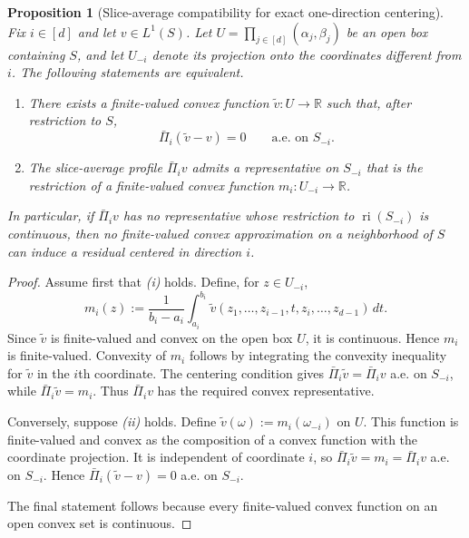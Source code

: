 \documentclass[11pt,letterpaper]{article}
\newtheorem{proposition}[theorem]{Proposition}
\theoremstyle{definition}
\theoremstyle{remark}
\begin{document}
\begin{proposition}[Slice-average compatibility for exact one-direction centering]
\label{prop:one_direction_centered_realizability}
Fix $i\in[d]$ and let $v\in L^1(S)$. Let
$U=\prod_{j\in[d]}(\alpha_j,\beta_j)$ be an open box containing $S$, and let
$U_{-i}$ denote its projection onto the coordinates different from $i$. The
following statements are equivalent.

\begin{enumerate}
\item[\emph{(i)}] There exists a finite-valued convex function
$\widetilde v:U\to\mathbb R$ such that, after restriction to $S$,
$$
\bar\Pi_i(\widetilde v-v)=0
\qquad
\text{a.e. on }S_{-i}.
$$

\item[\emph{(ii)}] The slice-average profile $\bar\Pi_i v$ admits a
representative on $S_{-i}$ that is the restriction of a finite-valued convex
function $m_i:U_{-i}\to\mathbb R$.
\end{enumerate}

In particular, if $\bar\Pi_i v$ has no representative whose restriction to
$\operatorname{ri}(S_{-i})$ is continuous, then no finite-valued convex
approximation on a neighborhood of $S$ can induce a residual centered in
direction $i$.
\end{proposition}

\begin{proof}
Assume first that \emph{(i)} holds. Define, for $z\in U_{-i}$,
$$
m_i(z):=
\frac{1}{b_i-a_i}
\int_{a_i}^{b_i}
\widetilde v(z_1,\ldots,z_{i-1},t,z_i,\ldots,z_{d-1})\,dt .
$$
Since $\widetilde v$ is finite-valued and convex on the open box $U$, it is
continuous. Hence $m_i$ is finite-valued. Convexity of $m_i$ follows by
integrating the convexity inequality for $\widetilde v$ in the $i$th
coordinate. The centering condition gives
$\bar\Pi_i\widetilde v=\bar\Pi_i v$ a.e. on $S_{-i}$, while
$\bar\Pi_i\widetilde v=m_i$. Thus $\bar\Pi_i v$ has the required convex
representative.

Conversely, suppose \emph{(ii)} holds. Define
$\widetilde v(\omega):=m_i(\omega_{-i})$ on $U$. This function is finite-valued
and convex as the composition of a convex function with the coordinate
projection. It is independent of coordinate $i$, so
$\bar\Pi_i\widetilde v=m_i=\bar\Pi_i v$ a.e. on $S_{-i}$. Hence
$\bar\Pi_i(\widetilde v-v)=0$ a.e. on $S_{-i}$.

The final statement follows because every finite-valued convex function on an
open convex set is continuous.
\end{proof}
\end{document}
